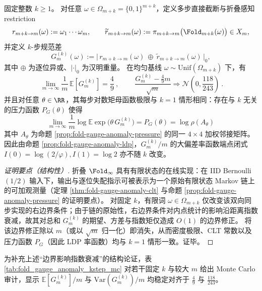 \begin{theorem}[多步降阶的规范差密度不变性]\label{thm:fold-gauge-anomaly-kstep-invariance}
固定整数 \(k\ge 1\)。
对任意 \(\omega\in\Omega_{m+k}=\{0,1\}^{m+k}\)，定义多步直接截断与折叠感知 restriction
\[
r_{m+k\to m}(\omega):=\omega_{1}\cdots\omega_{m},
\qquad
\widetilde r_{m+k\to m}(\omega):=\pi_{m+k\to m}\bigl(\Fold_{m+k}(\omega)\bigr)\in X_m,
\]
并定义 \(k\)-步规范差
\[
G_m^{(k)}(\omega):=\bigl|\,r_{m+k\to m}(\omega)\ \oplus\ \widetilde r_{m+k\to m}(\omega)\,\bigr|_0,
\]
其中 \(\oplus\) 为逐位异或、\(|\cdot|_0\) 为汉明重量。
在均匀基线 \(\omega\sim\mathrm{Unif}(\Omega_{m+k})\) 下，有
\[
\boxed{\ \lim_{m\to\infty}\frac{1}{m}\,\mathbb E\!\left[G_m^{(k)}\right]=\frac49\ },
\qquad
\boxed{\ \frac{G_m^{(k)}-\frac49 m}{\sqrt m}\Rightarrow \mathcal N\!\left(0,\frac{118}{243}\right)\ }.
\]
并且对任意 \(\theta\in\RR\)，其每步对数矩母函数极限与 \(k=1\) 情形相同：存在与 \(k\) 无关的压力函数 \(P_G(\theta)\) 使得
\[
\lim_{m\to\infty}\frac{1}{m}\log\mathbb E\exp\!\bigl(\theta\,G_m^{(k)}\bigr)=P_G(\theta)=\log\rho(A_\theta)
\]
其中 \(A_\theta\) 为命题 \ref{prop:fold-gauge-anomaly-pressure} 的同一 \(4\times 4\) 加权邻接矩阵。
因此由命题 \ref{prop:fold-gauge-anomaly-ldp}，\(G_m^{(k)}/m\) 的大偏差率函数端点闭式 \(I(0)=\log(2/\varphi), I(1)=\log 2\) 亦不随 \(k\) 改变。
\end{theorem}

\begin{proof}[证明要点（结构性）]
折叠 \(\Fold_\infty\) 具有有限状态的在线实现：在 IID Bernoulli\((1/2)\) 输入下，输出与逐位失配指示可被表示为一个原始有限状态 Markov 链上的可加观测量（定理 \ref{thm:fold-gauge-anomaly-clt} 与命题 \ref{prop:fold-gauge-anomaly-pressure} 的证明要点）。
对固定 \(k\)，有限词 \(\omega\in\Omega_{m+k}\) 仅改变该双向同步实现的右边界条件；由于链的原始性，右边界条件对内点统计的影响沿距离指数衰减，故其对总和 \(G_m^{(k)}\) 的期望、方差与指数矩仅造成 \(O(1)\) 的边界修正。
将该边界修正除以 \(m\)（或以 \(\sqrt m\) 归一化）即消失，从而密度极限、CLT 常数以及压力函数 \(P_G\)（因此 LDP 率函数）均与 \(k=1\) 情形一致。证毕。
\end{proof}

\begin{remark}\label{rem:fold-gauge-anomaly-kstep-mc}
为补充上述“边界影响指数衰减”的结构论证，表 \ref{tab:fold_gauge_anomaly_kstep_mc} 对若干固定 \(k\) 与较大 \(m\) 给出 Monte Carlo 审计，显示 \(\mathbb E[G_m^{(k)}]/m\) 与 \(\mathrm{Var}(G_m^{(k)})/m\) 均稳定对齐于 \(\frac49\) 与 \(\frac{118}{243}\)。
\end{remark}


